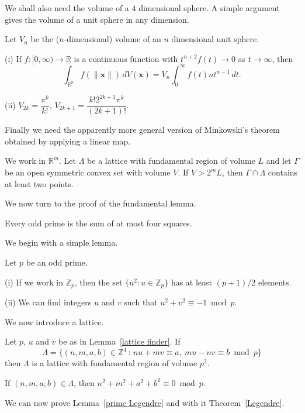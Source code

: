 We shall also need the volume of a $4$ dimensional
sphere. A simple argument gives the
volume of a unit sphere in any dimension.
\begin{lemma} Let $V_{n}$ be the ($n$-dimensional)
volume of an $n$ dimensional unit sphere.

(i) If $f:[0,\infty)\rightarrow{\mathbb R}$ is a continuous
function with $t^{n+2}f(t)\rightarrow 0$ as
$t\rightarrow\infty$, then
\[\int_{{\mathbb R}^{n}}f(\|{\mathbf x}\|)\,dV({\mathbf x})
=V_{n}\int_{0}^{\infty}f(t)nt^{n-1}\,dt.\]

(ii) $V_{2k}=\dfrac{\pi^{k}}{k!}$,
$V_{2k+1}=\dfrac{k!2^{2k+1}\pi^{k}}{(2k+1)!}$.
\end{lemma}

Finally we need the apparently more general
version of Minkowski's theorem obtained by
applying a linear map.
\begin{theorem}%
\label{Minkowski general} We work
in ${\mathbb R}^{m}$. Let $\Lambda$
be a lattice with fundamental region of volume $L$
and let $\Gamma$ be an open symmetric  convex set
with volume $V$.
If $V>2^{m}L$, then $\Gamma\cap\Lambda$
contains at least two points.
\end{theorem}

We now turn to the proof of the fundamental lemma.
\begin{lemma}\label{prime Legendre} Every odd prime is the sum
of at most four squares.
\end{lemma}
We begin with a simple lemma.
\begin{lemma}\label{lattice finder} Let $p$
be an odd prime.

(i)  If we work in ${\mathbb Z}_{p}$, then the set
$\{u^{2}:u\in {\mathbb Z}_{p}\}$ has at least $(p+1)/2$
elements.

(ii) We can find integers $u$ and $v$ such that
$u^{2}+v^{2}\equiv-1 \bmod p$.
\end{lemma}

We now introduce a lattice.
\begin{lemma} Let $p$, $u$ and $v$ be as in
Lemma~\ref{lattice finder}. If
\[\Lambda=\{(n,m,a,b)\in{\mathbb Z}^{4}
\, : \,
nu+mv\equiv a,\ mu-nv\equiv b \bmod p\}\]
then $\Lambda$ is a lattice
with fundamental region of volume $p^{2}$.

If $(n,m,a,b)\in\Lambda$, then
$n^{2}+m^{2}+a^{2}+b^{2}\equiv 0 \bmod p$.
\end{lemma}
We can now prove Lemma~\ref{prime Legendre} and with it
Theorem~\ref{Legendre}.

